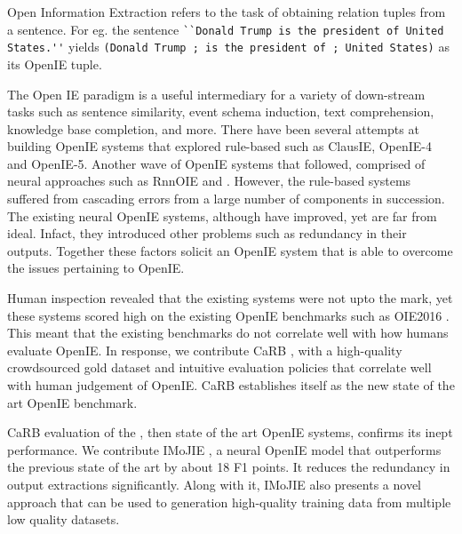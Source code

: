 \begin{comment}

  Skelaton

What is OpenIE - 1 line
list a few systems
problems with recent systems
new benchmark was needed
so we made carb, how is carb different
problems with openie models
imojie, mention perf improvements
errors made by imojie, add error analysis
mention mlil paper

\end{comment}

Open Information Extraction refers to the task of obtaining relation tuples from a sentence. For eg. the sentence \verb|``Donald Trump is the president of United States.''| yields \verb|(Donald Trump ; is the president of ; United States)| as its OpenIE tuple.

The Open IE paradigm is a useful intermediary for a variety of down-stream tasks such as sentence similarity, event schema induction, text comprehension, knowledge base completion, and more. There have been several attempts at building OpenIE systems that explored rule-based such as ClausIE, OpenIE-4 and OpenIE-5. Another wave of OpenIE systems that followed, comprised of neural approaches such as RnnOIE and \citet{cui&al18}. However, the rule-based systems suffered from cascading errors from a large number of components in succession. The existing neural OpenIE systems, although have improved, yet are far from ideal. Infact, they introduced other problems such as redundancy in their outputs. Together these factors solicit an OpenIE system that is able to overcome the issues pertaining to OpenIE.

Human inspection revealed that the existing systems were not upto the mark, yet these systems scored high on the existing OpenIE benchmarks such as OIE2016 \citep{OIE2016}. This meant that the existing benchmarks do not correlate well with how humans evaluate OpenIE. In response, we contribute CaRB \citep{bhardwaj&al19}, with a high-quality crowdsourced gold dataset and intuitive evaluation policies that correlate well with human judgement of OpenIE. CaRB establishes itself as the new state of the art OpenIE benchmark.

CaRB evaluation of the \citet{cui&al18}, then state of the art OpenIE systems, confirms its inept performance. We contribute IMoJIE \citep{kolluru&al20}, a neural OpenIE model that outperforms the previous state of the art by about 18 F1 points. It reduces the redundancy in output extractions significantly. Along with it, IMoJIE also presents a novel approach that can be used to generation high-quality training data from multiple low quality datasets.

